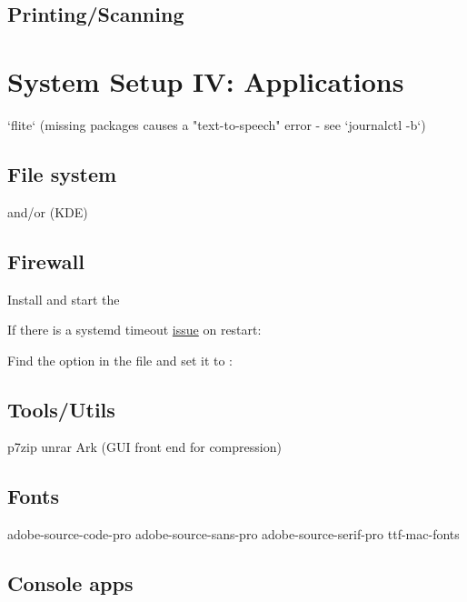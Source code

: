 \subsection{Printing/Scanning}



\section{System Setup IV: Applications}

`flite` (missing packages causes a "text-to-speech" error - see `journalctl -b`)


\subsection{File system}

 and/or  (KDE)

\subsection{Firewall}

Install  and start the 

If there is a systemd timeout \href{https://bugzilla.redhat.com/show_bug.cgi?id=1294415#c10}{issue} on restart: 
\begin{blocksection}
    Find the  option in the file and set it to :\\
\end{blocksection}

\subsection{Tools/Utils}

p7zip
unrar
Ark (GUI front end for compression)

\subsection{Fonts}

adobe-source-code-pro
adobe-source-sans-pro
adobe-source-serif-pro
ttf-mac-fonts

\subsection{Console apps}

